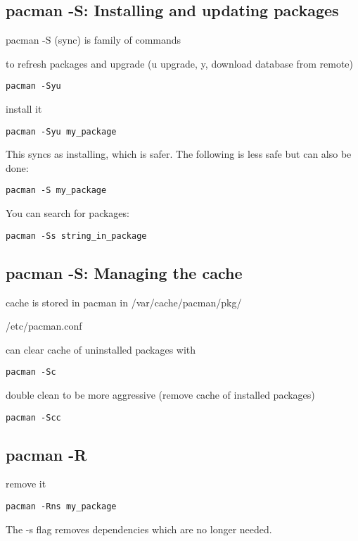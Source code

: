
\subsection{pacman -S: Installing and updating packages}


pacman -S (sync) is family of commands

to refresh packages and upgrade (u upgrade, y, download database from remote)

\begin{verbatim}
pacman -Syu
\end{verbatim}


install it
\begin{verbatim}
pacman -Syu my_package
\end{verbatim}

This syncs as installing, which is safer. The following is less safe but can also be done:

\begin{verbatim}
pacman -S my_package
\end{verbatim}

You can search for packages:

\begin{verbatim}
pacman -Ss string_in_package
\end{verbatim}


\subsection{pacman -S: Managing the cache}


cache is stored in pacman in /var/cache/pacman/pkg/


/etc/pacman.conf


can clear cache of uninstalled packages with
\begin{verbatim}
pacman -Sc
\end{verbatim}

double clean to be more aggressive (remove cache of installed packages)
\begin{verbatim}
pacman -Scc
\end{verbatim}


\subsection{pacman -R}
remove it
\begin{verbatim}
pacman -Rns my_package
\end{verbatim}

The -s flag removes dependencies which are no longer needed.

